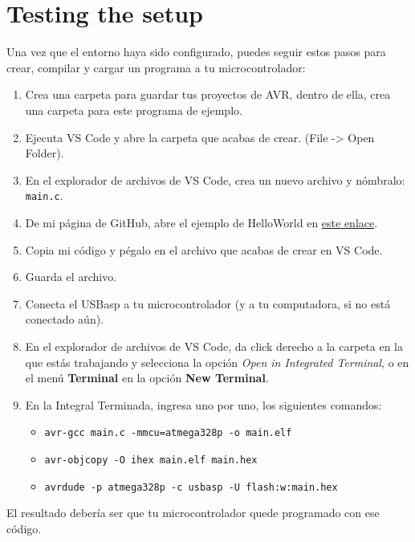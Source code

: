 \documentclass[10pt,letterpaper]{article}
\begin{document}
\section{Testing the setup}
Una vez que el entorno haya sido configurado, puedes seguir estos pasos para crear, compilar y cargar un programa a tu microcontrolador:
\begin{enumerate}
    \item Crea una carpeta para guardar tus proyectos de AVR, dentro de ella, crea una carpeta para este programa de ejemplo.
    \item Ejecuta VS Code y abre la carpeta que acabas de crear. (File -> Open Folder).
    \item En el explorador de archivos de VS Code, crea un nuevo archivo y nómbralo: {\color{ForestGreen}\texttt{main.c}}.
    \item De mi página de GitHub, abre el ejemplo de HelloWorld en \href{https://github.com/dagmtz/I7266/blob/master/004_Examples/mega328P/001_HelloWorld/main.c}{este enlace}.
    \item Copia mi código y pégalo en el archivo que acabas de crear en VS Code.
    \item Guarda el archivo.
    \item Conecta el USBasp a tu microcontrolador (y a tu computadora, si no está conectado aún).
    \item En el explorador de archivos de VS Code, da click derecho a la carpeta en la que estás trabajando y selecciona la opción \textit{Open in Integrated Terminal}, o en el menú \textbf{Terminal} en la opción \textbf{New Terminal}.
    \item En la Integral Terminada, ingresa uno por uno, los siguientes comandos: 
    \begin{itemize}
        \item \texttt{avr-gcc main.c -mmcu=atmega328p -o main.elf}
        \item \texttt{avr-objcopy -O ihex main.elf main.hex}
        \item \texttt{avrdude -p atmega328p -c usbasp -U flash:w:main.hex}
    \end{itemize}
\end{enumerate}
El resultado debería ser que tu microcontrolador quede programado con ese código.
\end{document}
